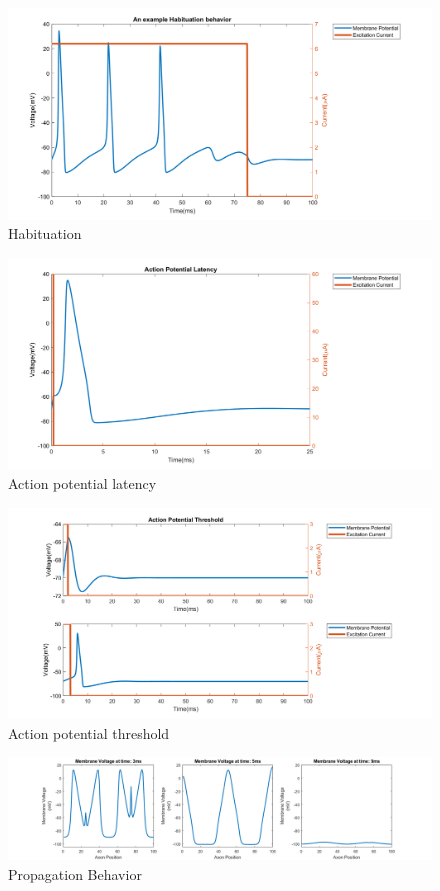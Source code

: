 \documentclass{IEEEtran}
\begin{document}
\vfill\null\newpage %
\begin{figure}[h]
\centering
\includegraphics[width=\textwidth]{Fig3.png}
\caption{Habituation}\label{fig:habit}
\end{figure} 
\begin{figure}[h]
\centering
\includegraphics[width=\textwidth]{Fig7.png}
\caption{Action potential latency}\label{fig:apl}
\end{figure}
\vfill\null
\newpage %
\begin{figure}[h]
\centering
\includegraphics[width=\textwidth]{Fig8.png}
\caption{Action potential threshold}\label{fig:apth}
\end{figure}
\begin{figure}[h]
\centering
\includegraphics[width=\textwidth]{prop.png}
\caption{Propagation Behavior}\label{fig:propagation}
\end{figure}
\vfill\null
\newpage %
\end{document}
